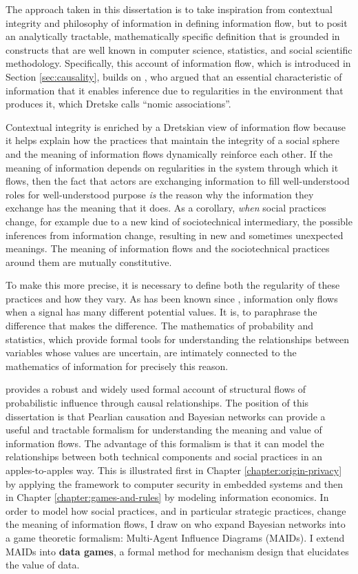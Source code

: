 \documentclass[../thesis.tex]{subfiles}
\begin{document}
 The approach taken in this dissertation is to take inspiration
 from contextual integrity and philosophy of information
 in defining information flow, but
 to posit an analytically tractable, mathematically specific
 definition that is grounded in constructs that are well known
 in computer science, statistics, and social scientific methodology.
 Specifically, this account of information flow, which is introduced
 in Section \ref{sec:causality},
 builds on \citet{dretske1981knowledge}, who argued that an
 essential characteristic of information that
 it enables inference due to regularities in the environment
 that produces it, which Dretske calls ``nomic associations''.

 Contextual integrity is enriched by a Dretskian view of
 information flow because it helps explain how the practices
 that maintain the integrity of a social sphere and the
 meaning of information flows dynamically reinforce each
 other.
 If the meaning of information depends on regularities in
 the system through which it flows, then the fact that
 actors are exchanging information to fill well-understood
 roles for well-understood purpose \textit{is} the reason why
 the information they exchange has the meaning that it does.
 As a corollary, \textit{when} social practices change, for
 example due to a new kind of sociotechnical intermediary,
 the possible inferences from information change, resulting
 in new and sometimes unexpected meanings.
 The meaning of information flows and the sociotechnical
 practices around them are mutually constitutive.

 To make this more precise, it is necessary to define both
 the regularity of these practices and how they vary.
 As has been known since \citet{shannon1948mathematical},
 information only flows when a signal has many different
 potential values. It is, to paraphrase \citet{bateson1972steps}
 the difference that makes the difference.
 The mathematics of probability and statistics, which provide
 formal tools for understanding the relationships between variables
 whose values are uncertain, are intimately connected to the
 mathematics of information for precisely this reason.

 \citet{pearl2009causality} provides a robust and widely used
 formal account of structural flows of probabilistic influence
 through causal relationships.
 The position of this dissertation is that Pearlian causation
 and Bayesian networks can provide a useful and tractable
 formalism for understanding the meaning and value of information
 flows.
 The advantage of this formalism is that it can model the
 relationships between both technical components and social
 practices in an apples-to-apples way.
 This is illustrated first in Chapter \ref{chapter:origin-privacy}
 by applying the framework to computer security in embedded systems
 and then in Chapter \ref{chapter:games-and-rules} by modeling
 information economics.
 In order to model how social practices, and in particular strategic
 practices, change the meaning of
 information flows, I draw on \citet{koller2003multi} who expand
 Bayesian networks into a game theoretic formalism: 
 Multi-Agent Influence Diagrams (MAIDs).
 I extend MAIDs into \textbf{data games}, a formal method
 for mechanism design that elucidates the value of data.
\end{document}
